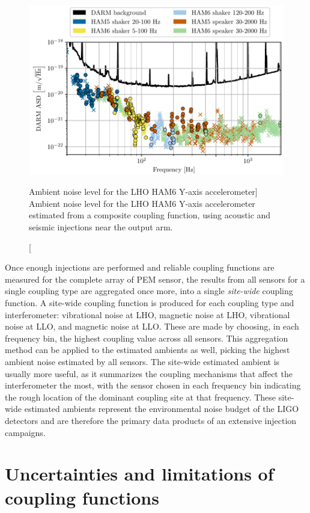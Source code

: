 \begin{figure}[h!]
	\centering
	\includegraphics{figures/noise-methods/cf-composite.pdf}
	\caption
	[Ambient noise level for the LHO HAM6 Y-axis accelerometer]
	{
		Ambient noise level for the LHO HAM6 Y-axis accelerometer estimated from a composite coupling function, using acoustic and seismic injections near the output arm.
		}
	\label{fig:cf-composite}
\end{figure}

Once enough injections are performed and reliable coupling functions are measured for the complete array of PEM sensor, the results from all sensors for a single coupling type are aggregated once more, into a single \textit{site-wide} coupling function.
A site-wide coupling function is produced for each coupling type and interferometer: vibrational noise at LHO, magnetic noise at LHO, vibrational noise at LLO, and magnetic noise at LLO.
These are made by choosing, in each frequency bin, the highest coupling value across all sensors.
This aggregation method can be applied to the estimated ambients as well, picking the highest ambient noise estimated by all sensors.
The site-wide estimated ambient is usually more useful, as it summarizes the coupling mechanisms that affect the interferometer the most, with the sensor chosen in each frequency bin indicating the rough location of the dominant coupling site at that frequency.
These site-wide estimated ambients represent the environmental noise budget of the LIGO detectors and are therefore the primary data products of an extensive injection campaigns.


\section{Uncertainties and limitations of coupling functions}\label{sec:uncertainties}


